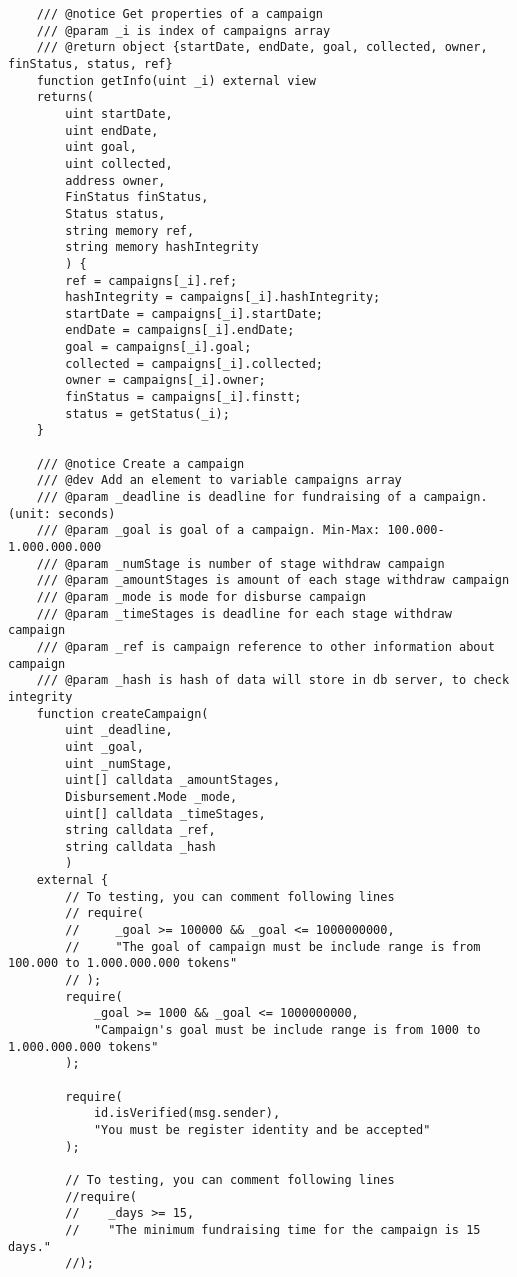 \documentclass[../main-report.tex]{subfiles}
\begin{document}
\begin{lstlisting}
    /// @notice Get properties of a campaign
    /// @param _i is index of campaigns array
    /// @return object {startDate, endDate, goal, collected, owner, finStatus, status, ref}
    function getInfo(uint _i) external view
    returns(
        uint startDate,
        uint endDate,
        uint goal,
        uint collected,
        address owner,
        FinStatus finStatus,
        Status status,
        string memory ref,
        string memory hashIntegrity
        ) {
        ref = campaigns[_i].ref;
        hashIntegrity = campaigns[_i].hashIntegrity;
        startDate = campaigns[_i].startDate;
        endDate = campaigns[_i].endDate;
        goal = campaigns[_i].goal;
        collected = campaigns[_i].collected;
        owner = campaigns[_i].owner;
        finStatus = campaigns[_i].finstt;
        status = getStatus(_i);
    }

    /// @notice Create a campaign
    /// @dev Add an element to variable campaigns array
    /// @param _deadline is deadline for fundraising of a campaign. (unit: seconds)
    /// @param _goal is goal of a campaign. Min-Max: 100.000-1.000.000.000
    /// @param _numStage is number of stage withdraw campaign
    /// @param _amountStages is amount of each stage withdraw campaign
    /// @param _mode is mode for disburse campaign
    /// @param _timeStages is deadline for each stage withdraw campaign
    /// @param _ref is campaign reference to other information about campaign
    /// @param _hash is hash of data will store in db server, to check integrity
    function createCampaign(
        uint _deadline,
        uint _goal,
        uint _numStage,
        uint[] calldata _amountStages,
        Disbursement.Mode _mode,
        uint[] calldata _timeStages,
        string calldata _ref,
        string calldata _hash
        )
    external {
        // To testing, you can comment following lines
        // require(
        //     _goal >= 100000 && _goal <= 1000000000,
        //     "The goal of campaign must be include range is from 100.000 to 1.000.000.000 tokens"
        // );
        require(
            _goal >= 1000 && _goal <= 1000000000,
            "Campaign's goal must be include range is from 1000 to 1.000.000.000 tokens"
        );

        require(
            id.isVerified(msg.sender),
            "You must be register identity and be accepted"
        );

        // To testing, you can comment following lines
        //require(
        //    _days >= 15,
        //    "The minimum fundraising time for the campaign is 15 days."
        //);


\end{lstlisting}
\end{document}
